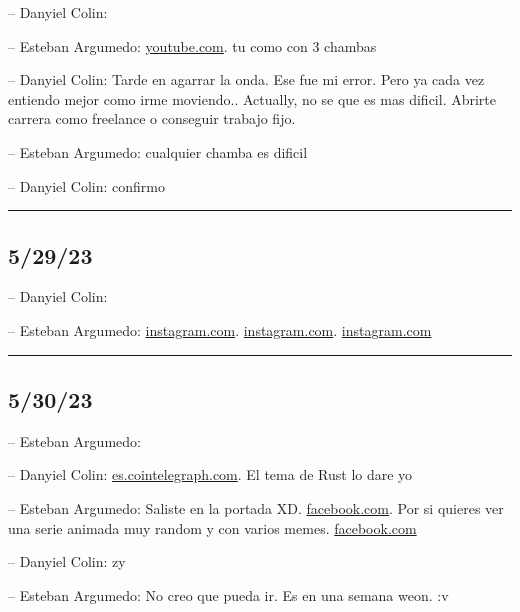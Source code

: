 -- Danyiel Colin:

-- Esteban Argumedo:
\href{https://www.youtube.com/watch?v=A4_TFHzqAAg}{youtube.com}. tu como
con 3 chambas

-- Danyiel Colin: Tarde en agarrar la onda. Ese fue mi error. Pero ya
cada vez entiendo mejor como irme moviendo.. Actually, no se que es mas
dificil. Abrirte carrera como freelance o conseguir trabajo fijo.

-- Esteban Argumedo: cualquier chamba es dificil

-- Danyiel Colin: confirmo

\begin{center}\rule{0.5\linewidth}{0.5pt}\end{center}

\hypertarget{section-205}{%
\subsection{5/29/23}\label{section-205}}

-- Danyiel Colin:

-- Esteban Argumedo:
\href{https://www.instagram.com/reel/CsysuE8gVlE/?igshid=MTc4MmM1YmI2Ng==}{instagram.com}.
\href{https://www.instagram.com/reel/CsVHZ2LOP0R/?igshid=MzRlODBiNWFlZA==}{instagram.com}.
\href{https://www.instagram.com/reel/Cr3g_aQJkHx/?igshid=MzRlODBiNWFlZA==}{instagram.com}

\begin{center}\rule{0.5\linewidth}{0.5pt}\end{center}

\hypertarget{section-206}{%
\subsection{5/30/23}\label{section-206}}

-- Esteban Argumedo:

-- Danyiel Colin:
\href{https://es.cointelegraph.com/news/polkadot-community-to-provide-rust-trainings-in-mexico-city}{es.cointelegraph.com}.
El tema de Rust lo dare yo

-- Esteban Argumedo: Saliste en la portada XD.
\href{https://www.facebook.com/reel/577743634300218?mibextid=9drbnH\&s=yWDuG2\&fs=e}{facebook.com}.
Por si quieres ver una serie animada muy random y con varios memes.
\href{https://www.facebook.com/reel/784172225936428?s=yWDuG2\&fs=e}{facebook.com}

-- Danyiel Colin: zy

-- Esteban Argumedo: No creo que pueda ir. Es en una semana weon. :v

